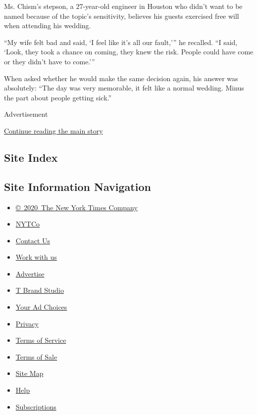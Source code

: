 Ms. Chism's stepson, a 27-year-old engineer in Houston who didn't want
to be named because of the topic's sensitivity, believes his guests
exercised free will when attending his wedding.

``My wife felt bad and said, `I feel like it's all our fault,''' he
recalled. ``I said, `Look, they took a chance on coming, they knew the
risk. People could have come or they didn't have to come.'''

When asked whether he would make the same decision again, his answer was
absolutely: ``The day was very memorable, it felt like a normal wedding.
Minus the part about people getting sick.''

Advertisement

\protect\hyperlink{after-bottom}{Continue reading the main story}

\hypertarget{site-index}{%
\subsection{Site Index}\label{site-index}}

\hypertarget{site-information-navigation}{%
\subsection{Site Information
Navigation}\label{site-information-navigation}}

\begin{itemize}
\tightlist
\item
  \href{https://help.nytimes3xbfgragh.onion/hc/en-us/articles/115014792127-Copyright-notice}{©~2020~The
  New York Times Company}
\end{itemize}

\begin{itemize}
\tightlist
\item
  \href{https://www.nytco.com/}{NYTCo}
\item
  \href{https://help.nytimes3xbfgragh.onion/hc/en-us/articles/115015385887-Contact-Us}{Contact
  Us}
\item
  \href{https://www.nytco.com/careers/}{Work with us}
\item
  \href{https://nytmediakit.com/}{Advertise}
\item
  \href{http://www.tbrandstudio.com/}{T Brand Studio}
\item
  \href{https://www.nytimes3xbfgragh.onion/privacy/cookie-policy\#how-do-i-manage-trackers}{Your
  Ad Choices}
\item
  \href{https://www.nytimes3xbfgragh.onion/privacy}{Privacy}
\item
  \href{https://help.nytimes3xbfgragh.onion/hc/en-us/articles/115014893428-Terms-of-service}{Terms
  of Service}
\item
  \href{https://help.nytimes3xbfgragh.onion/hc/en-us/articles/115014893968-Terms-of-sale}{Terms
  of Sale}
\item
  \href{https://spiderbites.nytimes3xbfgragh.onion}{Site Map}
\item
  \href{https://help.nytimes3xbfgragh.onion/hc/en-us}{Help}
\item
  \href{https://www.nytimes3xbfgragh.onion/subscription?campaignId=37WXW}{Subscriptions}
\end{itemize}
